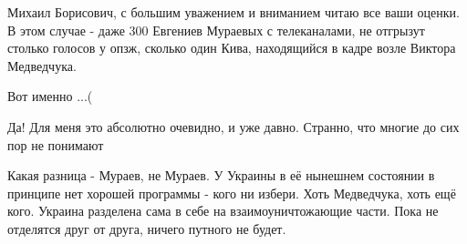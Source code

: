 \begin{itemize}

Михаил Борисович, с большим уважением и вниманием читаю все ваши оценки. В этом
случае - даже 300 Евгениев Мураевых с телеканалами, не отгрызут столько голосов
у опзж, сколько один Кива, находящийся в кадре возле Виктора Медведчука.


Вот именно ...(


Да! Для меня это абсолютно очевидно, и уже давно. Странно, что многие до сих
пор не понимают


Какая разница - Мураев, не Мураев. У Украины в её нынешнем состоянии в принципе
нет хорошей программы - кого ни избери. Хоть Медведчука, хоть ещё кого. Украина
разделена сама в себе на взаимоуничтожающие части. Пока не отделятся друг от
друга, ничего путного не будет.

\end{itemize} %
